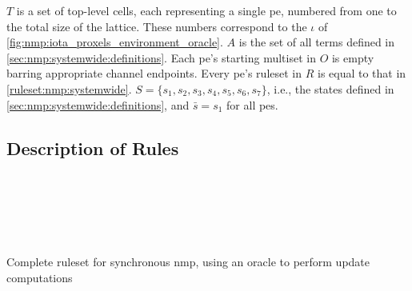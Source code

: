 \(T\) is a set of top-level cells, each representing a single \gls{pe}, numbered from one to the total size of the lattice.  These numbers correspond to the \(\iota\) of \cref{fig:nmp:iota_proxels_environment_oracle}.  \(A\) is the set of all terms defined in \cref{sec:nmp:systemwide:definitions}.  Each \gls{pe}'s starting multiset in \(O\) is empty barring appropriate channel endpoints.  Every \gls{pe}'s ruleset in \(R\) is equal to that in \cref{ruleset:nmp:systemwide}.  \(S = \{s_1, s_2, s_3, s_4, s_5, s_6, s_7\}\), i.e., the states defined in \cref{sec:nmp:systemwide:definitions}, and \(\bar{s} = s_1\) for all \glspl{pe}.

\subsection{Description of Rules}

\begin{cprulesetfloat}
    \begin{cpruleset}
        
        
        \\
        
        
        
        
        
        \\
        
        
        \\
        
        
        
    \end{cpruleset}
    \caption[Complete ruleset for synchronous \acrlong{nmp}]{\label{ruleset:nmp:systemwide}Complete ruleset for synchronous \gls{nmp}, using an oracle to perform update computations}
\end{cprulesetfloat}


